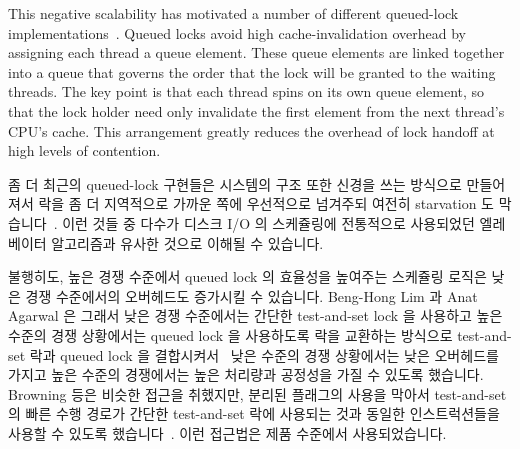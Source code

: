 This negative scalability has motivated a number of different
queued-lock
implementations~\cite{Anderson90,Graunke90,MellorCrummey91a,Wisniewski94,Craig93,Magnusson94,Takada93}.
Queued locks avoid high cache-invalidation overhead by assigning each
thread a queue element.
These queue elements are linked together into a queue that governs the
order that the lock will be granted to the waiting threads.
The key point is that each thread spins on its own queue element,
so that the lock holder need only invalidate the first element from
the next thread's CPU's cache.
This arrangement greatly reduces the overhead of lock handoff at high
levels of contention.
\fi

좀 더 최근의 queued-lock 구현들은 시스템의 구조 또한 신경을 쓰는 방식으로
만들어져서 락을 좀 더 지역적으로 가까운 쪽에 우선적으로 넘겨주되 여전히
starvation 도
막습니다~\cite{McKenney02e,radovic03hierarchical,radovic02efficient,BenJackson02,McKenney02d}.
이런 것들 중 다수가 디스크 I/O 의 스케쥴링에 전통적으로 사용되었던 엘레베이터
알고리즘과 유사한 것으로 이해될 수 있습니다.

불행히도, 높은 경쟁 수준에서 queued lock 의 효율성을 높여주는 스케쥴링 로직은
낮은 경쟁 수준에서의 오버헤드도 증가시킬 수 있습니다.
Beng-Hong Lim 과 Anat Agarwal 은 그래서 낮은 경쟁 수준에서는 간단한
test-and-set lock 을 사용하고 높은 수준의 경쟁 상황에서는 queued lock 을
사용하도록 락을 교환하는 방식으로 test-and-set 락과 queued lock 을
결합시켜서~\cite{BengHongLim94} 낮은 수준의 경쟁 상황에서는 낮은 오버헤드를
가지고 높은 수준의 경쟁에서는 높은 처리량과 공정성을 가질 수 있도록 했습니다.
Browning 등은 비슷한 접근을 취했지만, 분리된 플래그의 사용을 막아서
test-and-set 의 빠른 수행 경로가 간단한 test-and-set 락에 사용되는 것과 동일한
인스트럭션들을 사용할 수 있도록
했습니다~\cite{LukeBrowning2005SimpleLockNUMAAware}.
이런 접근법은 제품 수준에서 사용되었습니다.

